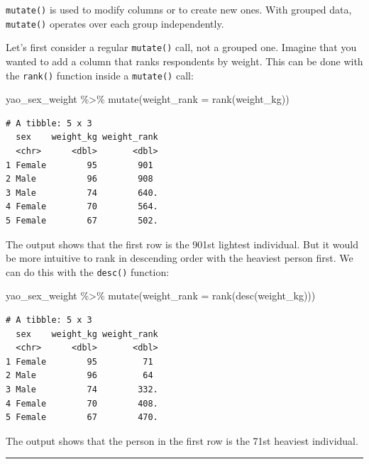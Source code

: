 \documentclass[
  letterpaper,
  DIV=11,
  numbers=noendperiod]{scrreprt}
\newenvironment{Shaded}{\begin{snugshade}}{\end{snugshade}}
\newcommand{\AttributeTok}[1]{\textcolor[rgb]{0.40,0.45,0.13}{#1}}
\newcommand{\FunctionTok}[1]{\textcolor[rgb]{0.28,0.35,0.67}{#1}}
\newcommand{\NormalTok}[1]{\textcolor[rgb]{0.00,0.23,0.31}{#1}}
\newcommand{\SpecialCharTok}[1]{\textcolor[rgb]{0.37,0.37,0.37}{#1}}
\begin{document}
\texttt{mutate()} is used to modify columns or to create new ones. With
grouped data, \texttt{mutate()} operates over each group independently.

Let's first consider a regular \texttt{mutate()} call, not a grouped
one. Imagine that you wanted to add a column that ranks respondents by
weight. This can be done with the \texttt{rank()} function inside a
\texttt{mutate()} call:

\begin{Shaded}
\begin{Highlighting}[]
\NormalTok{yao\_sex\_weight }\SpecialCharTok{\%\textgreater{}\%} 
  \FunctionTok{mutate}\NormalTok{(}\AttributeTok{weight\_rank =} \FunctionTok{rank}\NormalTok{(weight\_kg))}
\end{Highlighting}
\end{Shaded}

\begin{verbatim}
# A tibble: 5 x 3
  sex    weight_kg weight_rank
  <chr>      <dbl>       <dbl>
1 Female        95        901 
2 Male          96        908 
3 Male          74        640.
4 Female        70        564.
5 Female        67        502.
\end{verbatim}

The output shows that the first row is the 901st lightest individual.
But it would be more intuitive to rank in descending order with the
heaviest person first. We can do this with the \texttt{desc()} function:

\begin{Shaded}
\begin{Highlighting}[]
\NormalTok{yao\_sex\_weight }\SpecialCharTok{\%\textgreater{}\%} 
  \FunctionTok{mutate}\NormalTok{(}\AttributeTok{weight\_rank =} \FunctionTok{rank}\NormalTok{(}\FunctionTok{desc}\NormalTok{(weight\_kg)))}
\end{Highlighting}
\end{Shaded}

\begin{verbatim}
# A tibble: 5 x 3
  sex    weight_kg weight_rank
  <chr>      <dbl>       <dbl>
1 Female        95         71 
2 Male          96         64 
3 Male          74        332.
4 Female        70        408.
5 Female        67        470.
\end{verbatim}

The output shows that the person in the first row is the 71st heaviest
individual.

\begin{center}\rule{0.5\linewidth}{0.5pt}\end{center}
\end{document}
